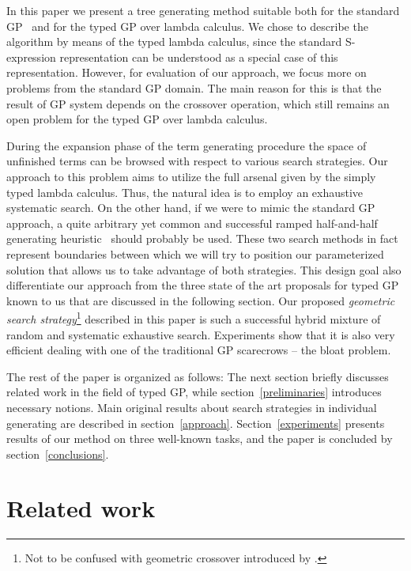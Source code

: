 \documentclass[conference]{IEEEtran}
\begin{document}
In this paper we present a tree generating method suitable both for the standard GP~\cite{koza92} and for the typed GP over lambda calculus. We chose to describe the algorithm by means of the typed lambda calculus, since the standard S-expression representation can be understood as a special case of this representation. However, for evaluation of our approach, we focus more on problems from the standard GP domain. The main reason for this is that the result of GP system depends on the crossover operation, which still remains an open problem for the typed GP over lambda calculus.

During the expansion phase of the term generating procedure the space of unfinished terms can be browsed with respect to various search strategies. Our approach to this problem aims to utilize the full arsenal given by the simply typed lambda calculus. Thus, the natural idea is to employ an exhaustive systematic search. On the other hand, if we were to mimic the standard GP approach, a quite arbitrary yet common and successful ramped half-and-half generating heuristic~\cite{fg} should probably be used.  
These two search methods in fact represent boundaries between which we will try to position our parameterized solution that allows us to take advantage of both strategies. This design goal also differentiate our approach from 
the three state of the art proposals for typed GP known to us that are discussed in the following section. 
Our proposed \emph{geometric
search strategy}\footnote{Not to be confused with geometric  crossover introduced by \cite{moraglio2010}.} described in this paper is such a successful hybrid mixture of random and systematic exhaustive search. Experiments show that it is also very efficient dealing with one of the traditional GP scarecrows -- the bloat problem.

The rest of the paper is organized as follows: The next section briefly discusses related work in the field of typed GP, while section~\ref{preliminaries} introduces necessary notions. Main original results about search strategies in individual generating are described in section~\ref{approach}. Section~\ref{experiments} presents results of our method on three well-known tasks, and the paper is concluded by section~\ref{conclusions}.

\section{Related work}
\label{related}
\end{document}
